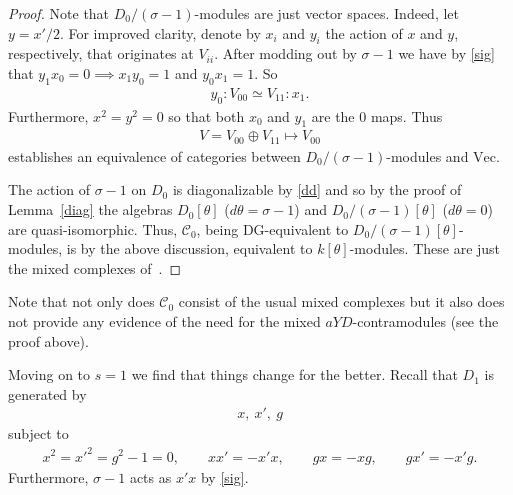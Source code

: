 \documentclass[11pt]{article}
\numberwithin{equation}{section}
\numberwithin{equation}{section}
\newcommand{\Cc}{\mathcal{C}}
\newcommand{\vect}{\text{Vec}}
\begin{document}
 \begin{proof}
Note that $D_0/(\sigma-1)$-modules are just vector spaces. Indeed, let $y=x'/2$. For improved clarity, denote by $x_i$ and $y_i$ the action of $x$ and $y$, respectively, that originates at $V_{ii}$. After modding out by $\sigma-1$ we have by \eqref{sig} that $y_1x_0=0\implies x_1y_0=1$ and $y_0x_1=1$. So
\begin{gather}
y_0:V_{00}\simeq V_{11}: x_1.
\end{gather}
Furthermore, $x^2=y^2=0$ so that both $x_0$ and $y_1$ are the $0$ maps. Thus
\begin{gather}
V=V_{00}\oplus V_{11}\mapsto V_{00}
\end{gather}
establishes an equivalence of categories between $D_0/(\sigma-1)$-modules and $\vect$.

The action of $\sigma-1$ on $D_0$ is diagonalizable by \eqref{dd} and so by the proof of Lemma~\ref{diag} the algebras $D_0[\theta]$ ($d\theta=\sigma-1$) and $D_0/(\sigma-1)[\theta]$ ($d\theta=0$) are quasi-isomorphic. Thus, $\Cc_0$, being DG-equivalent to $D_0/(\sigma-1)[\theta]$-modules, is by the above discussion, equivalent to $k[\theta]$-modules. These are just the mixed complexes of~\cite{kassel}.
\end{proof}

 \begin{Remark}
 Note that not only does $\Cc_0$ consist of the usual mixed complexes but it also does not provide any evidence of the need for the mixed $aYD$-contramodules (see the proof above).
 \end{Remark}

Moving on to $s=1$ we find that things change for the better. Recall that $D_1$ is generated by
\begin{gather}
x,\ x',\ g
\end{gather}
subject to
\begin{gather}
x^2=x'^2=g^2-1=0, \qquad
xx'=-x'x, \qquad
gx=-xg, \qquad
gx'=-x'g.
\end{gather}
Furthermore, $\sigma-1$ acts as $x'x$ by \eqref{sig}.
\end{document}

